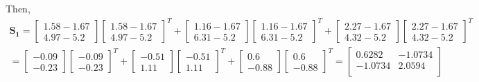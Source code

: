 \documentclass{homework}
\begin{document}
    Then, 
    \begin{equation*}
        \begin{gathered}
        \mathbf{S_1} = \begin{bmatrix}  1.58 - 1.67 \\ 4.97 - 5.2 \end{bmatrix}
        \begin{bmatrix}  1.58 - 1.67 \\ 4.97 - 5.2 \end{bmatrix}^T +
        \begin{bmatrix}  1.16 - 1.67 \\ 6.31 - 5.2 \end{bmatrix}
        \begin{bmatrix}  1.16 - 1.67 \\ 6.31 - 5.2 \end{bmatrix}^T + 
        \begin{bmatrix}  2.27 - 1.67 \\ 4.32 - 5.2 \end{bmatrix}
        \begin{bmatrix}  2.27 - 1.67 \\ 4.32 - 5.2 \end{bmatrix}^T \\[5pt]
        = \begin{bmatrix} -0.09 \\ -0.23\end{bmatrix}
        \begin{bmatrix} -0.09 \\ -0.23\end{bmatrix}^T +
        \begin{bmatrix} -0.51 \\ 1.11\end{bmatrix}
        \begin{bmatrix} -0.51 \\ 1.11\end{bmatrix}^T +
        \begin{bmatrix} 0.6 \\ -0.88\end{bmatrix}
        \begin{bmatrix} 0.6 \\ -0.88\end{bmatrix}^T = 
        \begin{bmatrix}
        0.6282 & -1.0734 \\
        -1.0734 & 2.0594 \\
        \end{bmatrix}

\end{gathered}
\end{equation*}
\end{document}
